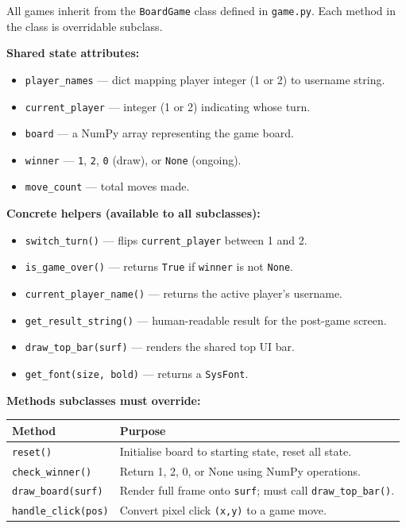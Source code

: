 \documentclass[12pt, letterpaper]{article}
\begin{document}
All games inherit from the \texttt{BoardGame} class defined in
\texttt{game.py}. Each method in the class is overridable
subclass.

\textbf{Shared state attributes:}
\begin{itemize}
    \item \texttt{player\_names} --- dict mapping player integer (1 or 2) to
          username string.
    \item \texttt{current\_player} --- integer (1 or 2) indicating whose turn.
    \item \texttt{board} --- a NumPy array representing the game board.
    \item \texttt{winner} --- \texttt{1}, \texttt{2}, \texttt{0} (draw), or
          \texttt{None} (ongoing).
    \item \texttt{move\_count} --- total moves made.
\end{itemize}

\textbf{Concrete helpers (available to all subclasses):}
\begin{itemize}
    \item \texttt{switch\_turn()} --- flips \texttt{current\_player} between 1
          and 2.
    \item \texttt{is\_game\_over()} --- returns \texttt{True} if
          \texttt{winner} is not \texttt{None}.
    \item \texttt{current\_player\_name()} --- returns the active player's
          username.
    \item \texttt{get\_result\_string()} --- human-readable result for the
          post-game screen.
    \item \texttt{draw\_top\_bar(surf)} --- renders the shared top UI bar.
    \item \texttt{get\_font(size, bold)} --- returns a \texttt{SysFont}.
\end{itemize}

\textbf{Methods subclasses must override:}

\begin{center}
\begin{tabular}{lp{9cm}}
\toprule
\textbf{Method} & \textbf{Purpose} \\
\midrule
\texttt{reset()} & Initialise board to starting state, reset all state. \\
\texttt{check\_winner()} & Return 1, 2, 0, or None using NumPy operations. \\
\texttt{draw\_board(surf)} & Render full frame onto \texttt{surf}; must call
\texttt{draw\_top\_bar()}. \\
\texttt{handle\_click(pos)} & Convert pixel click \texttt{(x,y)} to a game
move. \\
\bottomrule
\end{tabular}
\end{center}
\end{document}
